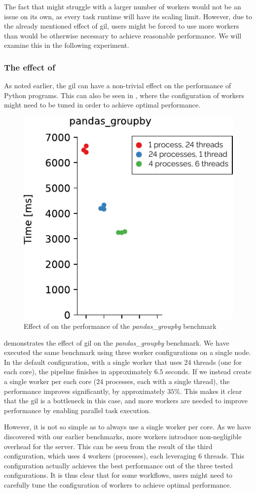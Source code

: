 The fact that \dask{} might struggle with a larger number of workers would not
be an issue on its own, as every task runtime will have its scaling limit. However, due to the
already mentioned effect of \gls{gil}, \dask{} users might be
forced to use more workers than would be otherwise necessary to achieve reasonable performance. We
will examine this in the following experiment.

\subsubsection*{The effect of }
As noted earlier, the \gls{gil} can have a non-trivial effect on the performance
of Python programs. This can also be seen in \dask{}, where the configuration
of workers might need to be tuned in order to achieve optimal performance.

\begin{figure}
	\centering
	\includegraphics[width=0.3\linewidth]{./imgs/rsds/charts/dask-gil-scaling}
	\caption{Effect of  on the performance of the \emph{pandas\_groupby} benchmark}
	\label{fig:dask-gil-scaling}
\end{figure}

 demonstrates the effect of \gls{gil} on the
\emph{pandas\_groupby} benchmark. We have executed the same benchmark using three
\dask{} worker configurations on a single node. In the default configuration,
with a single worker that uses \num{24} threads (one for each core), the pipeline
finishes in approximately $6.5$ seconds. If we instead create a single worker
per each core (\num{24} processes, each with a single thread), the performance
improves significantly, by approximately $35\%$. This makes it clear that the
\gls{gil} is a bottleneck in this case, and more \dask{}
workers are needed to improve performance by enabling parallel task execution.

However, it is not so simple as to always use a single \dask{} worker per core.
As we have discovered with our earlier benchmarks, more workers introduce non-negligible overhead
for the \dask{} server. This can be seen from the result of the third
configuration, which uses \num{4} \dask{} workers
(processes), each leveraging \num{6} threads. This configuration actually
achieves the best performance out of the three tested configurations. It is thus clear that for
some \dask{} workflows, users might need to carefully tune the configuration of
workers to achieve optimal performance.


